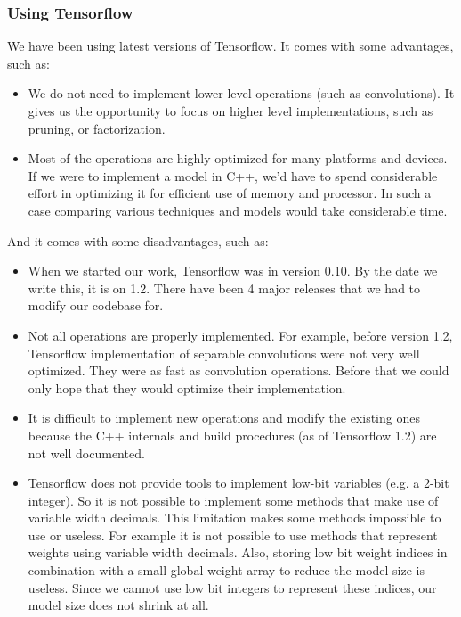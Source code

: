 \subsubsection{Using Tensorflow}
We have been using latest versions of Tensorflow. It comes with some advantages, such as:
\begin{itemize}
\item We do not need to implement lower level operations (such as convolutions). It gives us the opportunity to focus on higher level implementations, such as pruning, or factorization. 
\item Most of the operations are highly optimized for many platforms and devices. If we were to implement a model in C++, we'd have to spend considerable effort in optimizing it for efficient use of memory and processor. In such a case comparing various techniques and models would take considerable time.
\end{itemize}

And it comes with some disadvantages, such as:

\begin{itemize}
\item When we started our work, Tensorflow was in version 0.10. By the date we write this, it is on 1.2. There have been 4 major releases that we had to modify our codebase for.
\item Not all operations are properly implemented. For example, before version 1.2, Tensorflow implementation of separable convolutions were not very well optimized. They were as fast as convolution operations. Before that we could only hope that they would optimize their implementation.
\item It is difficult to implement new operations and modify the existing ones because the C++ internals and build procedures (as of Tensorflow 1.2) are not well documented. 
\item Tensorflow does not provide tools to implement low-bit variables (e.g. a 2-bit integer). So it is not possible to implement some methods that make use of variable width decimals. This limitation makes some methods impossible to use or useless. For example it is not possible to use methods that represent weights using variable width decimals. Also, storing low bit weight indices in combination with a small global weight array to reduce the model size is useless. Since we cannot use low bit integers to represent these indices, our model size does not shrink at all.
\end{itemize}
